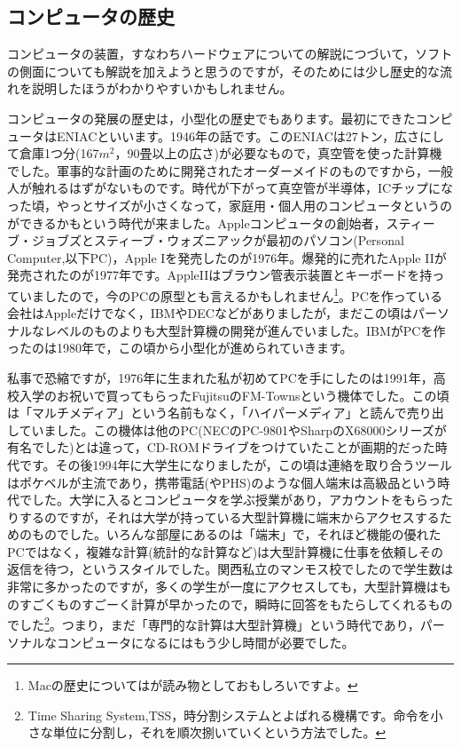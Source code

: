 \documentclass{ltjsbook}
\begin{document}
\subsection{コンピュータの歴史}
コンピュータの装置，すなわちハードウェアについての解説につづいて，ソフトの側面についても解説を加えようと思うのですが，そのためには少し歴史的な流れを説明したほうがわかりやすいかもしれません。

コンピュータの発展の歴史は，小型化の歴史でもあります。最初にできたコンピュータはENIACといいます。1946年の話です。このENIACは27トン，広さにして倉庫1つ分(167$m^2$，90畳以上の広さ)が必要なもので，真空管を使った計算機でした。軍事的な計画のために開発されたオーダーメイドのものですから，一般人が触れるはずがないものです。時代が下がって真空管が半導体，ICチップになった頃，やっとサイズが小さくなって，家庭用・個人用のコンピュータというのができるかもという時代が来ました。Appleコンピュータの創始者，スティーブ・ジョブズとスティーブ・ウォズニアックが最初のパソコン(Personal Computer,以下PC)，Apple Iを発売したのが1976年。爆発的に売れたApple IIが発売されたのが1977年です。AppleIIはブラウン管表示装置とキーボードを持っていましたので，今のPCの原型とも言えるかもしれません\footnote{Macの歴史については\textcite{Isaacson2012}が読み物としておもしろいですよ。}。PCを作っている会社はAppleだけでなく，IBMやDECなどがありましたが，まだこの頃はパーソナルなレベルのものよりも大型計算機の開発が進んでいました。IBMがPCを作ったのは1980年で，この頃から小型化が進められていきます。

私事で恐縮ですが，1976年に生まれた私が初めてPCを手にしたのは1991年，高校入学のお祝いで買ってもらったFujitsuのFM-Townsという機体でした。この頃は「マルチメディア」という名前もなく，「ハイパーメディア」と読んで売り出していました。この機体は他のPC(NECのPC-9801やSharpのX68000シリーズが有名でした)とは違って，CD-ROMドライブをつけていたことが画期的だった時代です。その後1994年に大学生になりましたが，この頃は連絡を取り合うツールはポケベルが主流であり，携帯電話(やPHS)のような個人端末は高級品という時代でした。大学に入るとコンピュータを学ぶ授業があり，アカウントをもらったりするのですが，それは大学が持っている大型計算機に端末からアクセスするためのものでした。いろんな部屋にあるのは「端末」で，それほど機能の優れたPCではなく，複雑な計算(統計的な計算など)は大型計算機に仕事を依頼しその返信を待つ，というスタイルでした。関西私立のマンモス校でしたので学生数は非常に多かったのですが，多くの学生が一度にアクセスしても，大型計算機はものすごくものすごーく計算が早かったので，瞬時に回答をもたらしてくれるものでした\footnote{Time Sharing System,TSS，時分割システムとよばれる機構です。命令を小さな単位に分割し，それを順次捌いていくという方法でした。}。つまり，まだ「専門的な計算は大型計算機」という時代であり，パーソナルなコンピュータになるにはもう少し時間が必要でした。
\end{document}
